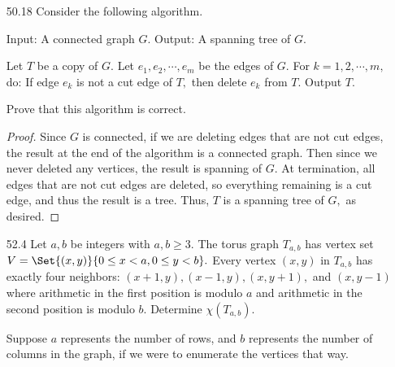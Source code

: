 \documentclass{article}
\begin{document}
\begin{itemize}
\begin{enumerate}[(a)]
\begin{center}
				\end{center}
				\begin{proof}
					If there did exist a Hamiltonian cycle, then it would consist of 25 vertices and 25 edges. Since the graph itself has 28 edges, we would need to delete 3 edges to create a cycle, that is, every vertex would have degree 2. However, this is clearly impossible, so there is no Hamiltonian cycle.
				\end{proof}

		\end{enumerate}

	\item[50.18] Consider the following algorithm. 
		\begin{itemize}
				\ii Input: A connected graph $G.$
				\ii Output: A spanning tree of $G.$
		\end{itemize}
		\begin{enumerate}
				\ii Let $T$ be a copy of $G.$
				\ii Let $e_1, e_2, \cdots, e_m$ be the edges of $G.$
				\ii For $k=1, 2, \cdots, m,$ do: If edge $e_k$ is not a cut edge of $T,$ then delete $e_k$ from $T.$
				\ii Output $T.$
		\end{enumerate}
		Prove that this algorithm is correct. 
		\begin{proof}
			Since $G$ is connected, if we are deleting edges that are not cut edges, the result at the end of the algorithm is a connected graph. Then since we never deleted any vertices, the result is spanning of $G.$ At termination, all edges that are not cut edges are deleted, so everything remaining is a cut edge, and thus the result is a tree. Thus, $T$ is a spanning tree of $G,$ as desired.
		\end{proof}

	\item[52.4] Let $a, b$ be integers with $a, b\ge 3.$ The torus graph $T_{a, b}$ has vertex set $V=\Set{(x, y)}{0\le x<a, 0\le y<b}.$ Every vertex $(x, y)$ in $T_{a, b}$ has exactly four neighbors: $(x+1, y), (x-1, y), (x, y+1),$ and $(x, y-1)$ where arithmetic in the first position is modulo $a$ and arithmetic in the second position is modulo $b.$ Determine $\chi(T_{a, b}).$
		\begin{soln}
			Suppose $a$ represents the number of rows, and $b$ represents the number of columns in the graph, if we were to enumerate the vertices that way.


\end{soln}
\end{itemize}
\end{document}
